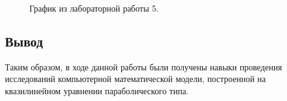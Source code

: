 \documentclass[a4paper,14pt]{article}
\begin{document}
\newpage
\begin{figure}[!h]
	\caption{График из лабораторной работы 5.}
	\label{fig:gr2}
\end{figure}

\subsection*{Вывод}

Таким образом, в ходе данной работы были получены навыки 
проведения исследований компьютерной математической модели,
построенной на квазилинейном уравнении параболического типа.
\end{document}
